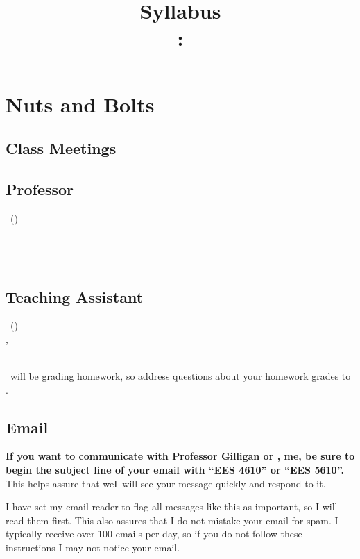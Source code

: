 \documentclass[11pt,twoside]{jgsyllabus}\usepackage[]{graphicx}\usepackage[]{xcolor}
\title{Syllabus\\
\ShortCourseNumber: \LongCourseName}
\begin{document}
\maketitle

\section[Nuts \& Bolts]{Nuts and Bolts}
\label{sec:NutsAndBolts}
\subsection{Class Meetings}
\ClassMeetings
\subsection{Professor}
\label{sec:Professor}
\ProfName\ (\ProfPronouns)\\
\ProfDescr\\
\ProfOffice\\
\ProfEmail\\
\ProfOfficeHours
%
\ifTA
\subsection{Teaching Assistant}
\label{sec:TA}
\TaName\ (\TaPronouns)\\
\TaOfficeLoc\ifTaPhone , \TaPhone\fi\\
\TaEmail\\
\TaOfficeHours
\medskip

\noindent
\TaTitle\ will be grading homework, so address questions about your homework grades
to \TaAccusative.
\fi

\subsection{Email}
\textbf{%
If you want to communicate with
\ifTA
Professor Gilligan or \TaTitle,
\else
me,
\fi
be sure to begin the
subject line of your email with ``{\scshape EES 4610}'' or ``{\scshape EES 5610}''.
}%
This helps assure
that \ifTA we\else I\fi\ will see your message quickly and respond to it.

I have set my email reader to flag all messages like this as important, so I
will read them first. This also assures that I do not mistake your email for
spam. I typically receive over 100 emails per day, so if you do not follow these
instructions I may not notice your email.
\end{document}
